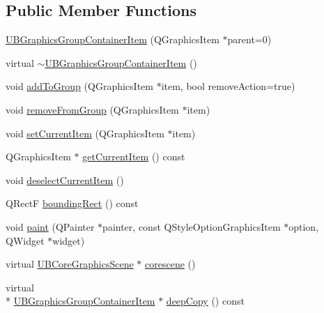 \subsection*{Public Member Functions}
\begin{DoxyCompactItemize}
\item 
\hyperlink{class_u_b_graphics_group_container_item_a2aaeb364079830d1720110c30f999ec8}{U\-B\-Graphics\-Group\-Container\-Item} (Q\-Graphics\-Item $\ast$parent=0)
\item 
virtual \hyperlink{class_u_b_graphics_group_container_item_af4d69918a8fe8459b4f70e1f291ebacf}{$\sim$\-U\-B\-Graphics\-Group\-Container\-Item} ()
\item 
void \hyperlink{class_u_b_graphics_group_container_item_ac5b04f9899f76674245aeb2e8bc73095}{add\-To\-Group} (Q\-Graphics\-Item $\ast$item, bool remove\-Action=true)
\item 
void \hyperlink{class_u_b_graphics_group_container_item_a7da3a6916abfde2a91c77b9ec2ab974c}{remove\-From\-Group} (Q\-Graphics\-Item $\ast$item)
\item 
void \hyperlink{class_u_b_graphics_group_container_item_ae52daee7b60e1306eeadf135896a53cc}{set\-Current\-Item} (Q\-Graphics\-Item $\ast$item)
\item 
Q\-Graphics\-Item $\ast$ \hyperlink{class_u_b_graphics_group_container_item_a071b128d07bfc63bb5c5e7c23165b525}{get\-Current\-Item} () const 
\item 
void \hyperlink{class_u_b_graphics_group_container_item_a162cb637cd3d001612aff2ac301809cb}{deselect\-Current\-Item} ()
\item 
Q\-Rect\-F \hyperlink{class_u_b_graphics_group_container_item_a5fce14470bd8997b8ff38a06252f2c1e}{bounding\-Rect} () const 
\item 
void \hyperlink{class_u_b_graphics_group_container_item_a9c1cc570884ac8ee043aaac32601b986}{paint} (Q\-Painter $\ast$painter, const Q\-Style\-Option\-Graphics\-Item $\ast$option, Q\-Widget $\ast$widget)
\item 
virtual \hyperlink{class_u_b_core_graphics_scene}{U\-B\-Core\-Graphics\-Scene} $\ast$ \hyperlink{class_u_b_graphics_group_container_item_a5b3ed1dc13045ed21fb5a52cc102f810}{corescene} ()
\item 
virtual \\*
\hyperlink{class_u_b_graphics_group_container_item}{U\-B\-Graphics\-Group\-Container\-Item} $\ast$ \hyperlink{class_u_b_graphics_group_container_item_aeb38fce11d606a6a0c97544ff5fa776f}{deep\-Copy} () const 
\item 

\end{DoxyCompactItemize}
